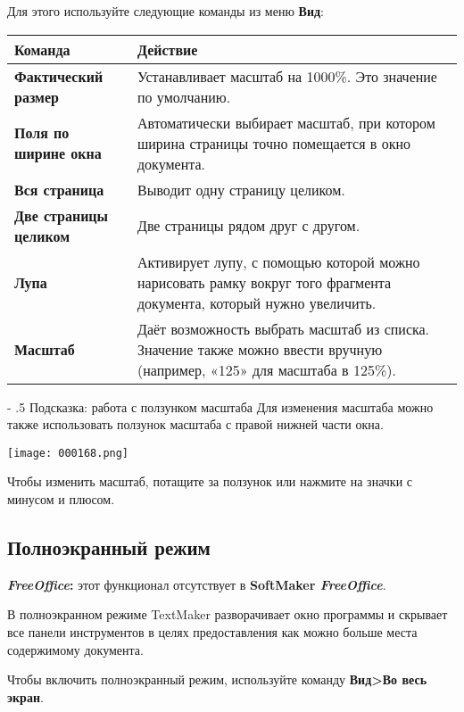 ﻿\documentclass[a4paper,10pt]{article}
\makeatletter
\renewcommand\paragraph{%
   \@startsection{paragraph}{4}{0mm}%
      {-\baselineskip}%
      {.5\baselineskip}%
      {\normalfont\normalsize\bfseries}}
\makeatother
\begin{document}
 Для этого используйте следующие команды из меню \textbf{Вид}:
 \newline
 \newline
 \begin{tabular}{  m{5cm}  m{11cm}  }  
 \textbf{Команда} & \textbf{Действие}\\ 
 \hline
  \textbf{Фактический размер} & Устанавливает масштаб на 1000\%. Это значение по умолчанию.\\
  \textbf{Поля по ширине окна} & Автоматически выбирает масштаб, при котором ширина страницы точно помещается в окно документа.\\ 
\textbf{Вся страница} & Выводит одну страницу целиком.\\
\textbf{Две страницы целиком} & Две страницы рядом друг с другом.\\
\textbf{Лупа} & Активирует лупу, с помощью которой можно нарисовать рамку вокруг того фрагмента документа, который нужно увеличить.\\
\textbf{Масштаб} & Даёт возможность выбрать масштаб из списка. Значение также можно ввести вручную (например, «125» для масштаба в 125\%).\\
\end{tabular} 
 
 \paragraph{Подсказка: работа с ползунком масштаба}
 Для изменения масштаба можно также использовать ползунок масштаба с правой нижней части окна.
 
 \texttt{[image: 000168.png]}
 
 Чтобы изменить масштаб, потащите за ползунок или нажмите на значки с минусом и плюсом.
 
 \subsection{Полноэкранный режим}
 \begin{mdframed}[backgroundcolor=pink!50]
\textbf{\textit{FreeOffice}:} этот функционал отсутствует в \textbf{SoftMaker \textit{FreeOffice}}.
\end{mdframed}

В полноэкранном режиме TextMaker разворачивает окно программы и скрывает все панели инструментов в целях предоставления как можно больше места содержимому документа.

Чтобы включить полноэкранный режим, используйте команду \textbf{Вид>Во весь экран}.
\end{document}
